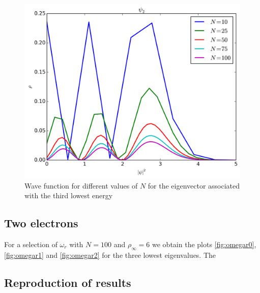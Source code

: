 \documentclass[11pt,a4paper,english,draft]{article}
\numberwithin{equation}{section}
\newcommand{\figurewidth}{.85\textwidth}
\begin{document}
\begin{figure}
\centering
\includegraphics[width=\figurewidth]{../results/N_compare_psi2.png}
\caption{Wave function for different values of $N$ for
the eigenvector associated with the third lowest energy}
\label{fig:psi2N}
\end{figure}

\subsection{Two electrons}

For a selection of $\omega_r$ with $N = 100$ and $\rho_\infty = 6$ we
obtain the plots \ref{fig:omegar0}, \ref{fig:omegar1} and 
\ref{fig:omegar2} for the three lowest eigenvalues. The 

\subsection{Reproduction of results}
\end{document}
